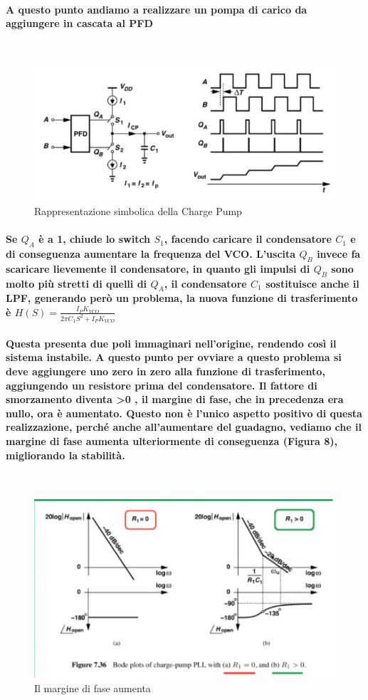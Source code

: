 \documentclass{article}
\begin{document}
\paragraph{A questo punto andiamo a realizzare un pompa di carico da aggiungere in cascata al PFD}
~\begin{figure}[!h]%
\includegraphics[scale=0.6]{CP.png} 
\caption{Rappresentazione simbolica della Charge Pump}
\label{fig:foo}
\end{figure}
\paragraph{Se $Q_A$ è a 1, chiude lo switch $S_1$, facendo caricare il condensatore $C_1$ e di conseguenza aumentare la frequenza del VCO.
L'uscita $Q_B$ invece fa scaricare lievemente il condensatore, in quanto gli impulsi di $Q_B$ sono molto più stretti di quelli di $Q_A$, il condensatore $C_1$ sostituisce anche il LPF, generando però un problema, la nuova funzione di trasferimento è $H(S)=\frac{I_PK_{VCO}}{2\pi C_1S^2+I_PK_{VCO}}$}

\paragraph{Questa presenta due poli immaginari nell'origine, rendendo così il sistema instabile. A questo punto per ovviare a questo problema si deve  aggiungere uno zero in zero alla funzione di trasferimento, aggiungendo un resistore prima del condensatore.
Il fattore di smorzamento diventa \textgreater 0 , il margine di fase, che in precedenza era nullo, ora è aumentato.  
Questo non è l'unico aspetto positivo di questa realizzazione, perché anche all'aumentare del guadagno, vediamo che il margine di fase aumenta ulteriormente di conseguenza (Figura 8), migliorando la stabilità.}
~\begin{figure}[!h]%
\includegraphics[scale=0.8]{ZPFD.png} 
\caption{Il margine di fase aumenta}
\label{fig:foo}
\end{figure}
\end{document}
